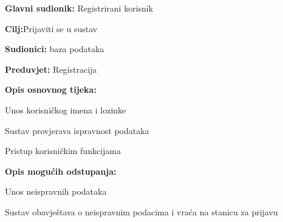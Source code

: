 \noindent {}
\begin{packed_item}

	\item \textbf{Glavni sudionik: }Registrirani korisnik
	\item  \textbf{Cilj:}Prijaviti se u sustav
	\item  \textbf{Sudionici:} baza podataka
	\item  \textbf{Preduvjet:} Registracija
	\item  \textbf{Opis osnovnog tijeka:}

	\item[] \begin{packed_enum}

				\item Unos korisničkog imena i lozinke
				\item Sustav provjerava ispravnost podataka
				\item Pristup korisničkim funkcijama
	\end{packed_enum}

	\item  \textbf{Opis mogućih odstupanja:}

	\item[] \begin{packed_item}

				\item[2.a] Unos neispravnih podataka
				\item[] \begin{packed_enum}

							\item  Sustav obavještava o neispravnim podacima i vraća na stanicu za prijavu


				\end{packed_enum}

	\end{packed_item}
\end{packed_item}


